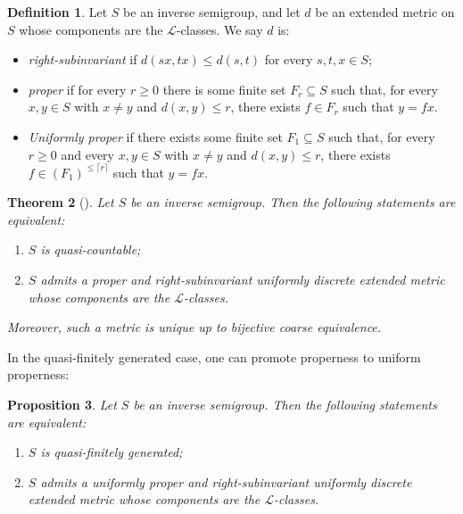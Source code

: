\documentclass[svgnames]{amsart}
\theoremstyle{plain}
\newtheorem{thm}{Theorem}[section]
\newtheorem{prop}[thm]{Proposition}
\theoremstyle{definition}
\newtheorem{defn}[thm]{Definition}
\begin{document}
\begin{defn}
    Let $S$ be an inverse semigroup, and let $d$ be an extended metric on $S$ whose components are the $\mathcal L$-classes. We say $d$ is:
    \begin{itemize}
        \item \emph{right-subinvariant} if $d(sx, tx) \le  d(s, t)$ for every $s, t, x \in S$;
        \item \emph{proper} if for every $r\ge 0$ there is some finite set $F_r\subseteq S$ such that, for every $x,y\in S$ with $x\neq y$ and $d(x, y) \le r$,  there exists $f\in F_r$ such that $y =fx$. 
        \item \emph{Uniformly proper} if there exists some finite set $F_1\subseteq S$ such that, for every $r\ge 0$ and every $x,y\in S$ with $x\neq y$ and $d(x, y) \le r$, there exists $f\in (F_1)^{\leq\lceil r\rceil}$ such that $y =fx$.
    \end{itemize} 
\end{defn}

\begin{thm}[{\cite[Theorem 1]{Chung_Martinez_szakacs}}]\label{thm:cms}
    Let $S$ be an inverse semigroup. Then the following statements are equivalent:
    \begin{enumerate}
        \item $S$ is quasi-countable; 
        \item $S$ admits a proper and right-subinvariant uniformly discrete extended metric whose components are the $\mathcal L$-classes.
    \end{enumerate}
Moreover, such a metric is unique up to bijective coarse equivalence.
\end{thm}

\noindent In the quasi-finitely generated case, one can promote properness to uniform properness:

\begin{prop}\label{prop:qfg_iff_unifproper}
        Let $S$ be an inverse semigroup. Then the following statements are equivalent:
    \begin{enumerate}
        \item\label{item:qfg} $S$ is quasi-finitely generated;
        \item\label{item:unifproper} $S$ admits a uniformly proper and right-subinvariant uniformly discrete extended metric whose components are the $\mathcal L$-classes.
    \end{enumerate}
\end{prop}
\end{document}
